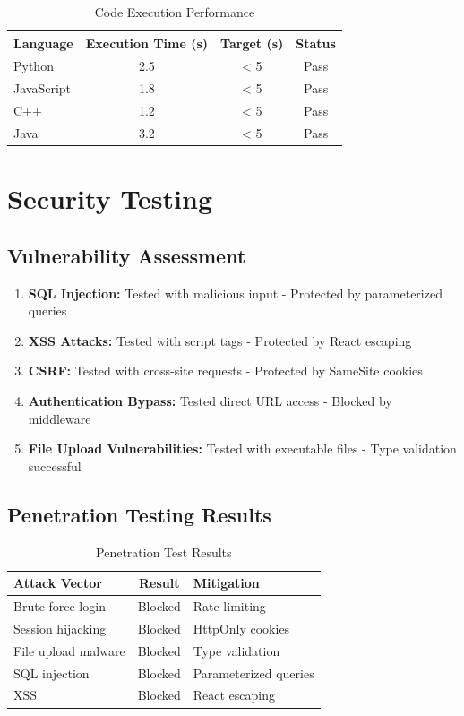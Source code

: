 \begin{table}[H]
\centering
\begin{tabular}{|l|c|c|c|}
\hline
\textbf{Language} & \textbf{Execution Time (s)} & \textbf{Target (s)} & \textbf{Status} \\
\hline
Python & 2.5 & < 5 & Pass \\
JavaScript & 1.8 & < 5 & Pass \\
C++ & 1.2 & < 5 & Pass \\
Java & 3.2 & < 5 & Pass \\
\hline
\end{tabular}
\caption{Code Execution Performance}
\end{table}

\section{Security Testing}

\subsection{Vulnerability Assessment}

\begin{enumerate}
\item \textbf{SQL Injection:} Tested with malicious input - Protected by parameterized queries
\item \textbf{XSS Attacks:} Tested with script tags - Protected by React escaping
\item \textbf{CSRF:} Tested with cross-site requests - Protected by SameSite cookies
\item \textbf{Authentication Bypass:} Tested direct URL access - Blocked by middleware
\item \textbf{File Upload Vulnerabilities:} Tested with executable files - Type validation successful
\end{enumerate}

\subsection{Penetration Testing Results}

\begin{table}[H]
\centering
\begin{tabular}{|l|c|l|}
\hline
\textbf{Attack Vector} & \textbf{Result} & \textbf{Mitigation} \\
\hline
Brute force login & Blocked & Rate limiting \\
Session hijacking & Blocked & HttpOnly cookies \\
File upload malware & Blocked & Type validation \\
SQL injection & Blocked & Parameterized queries \\
XSS & Blocked & React escaping \\
\hline
\end{tabular}
\caption{Penetration Test Results}
\end{table}

